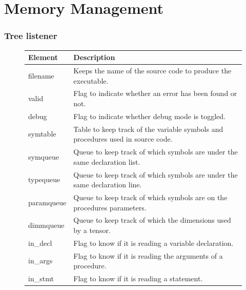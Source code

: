 \section{Memory Management}
\subsubsection{Tree listener}
\begin{figure}[h]
    \centering
    \begin{tabular}{p{1in}p{3in}}
        \toprule
        \textbf{Element} & \textbf{Description}\\
        \midrule filename &
        Keeps the name of the source code to produce the executable.\\

        \midrule valid &
        Flag to indicate whether an error has been found or not.\\

        \midrule debug &
        Flag to indicate whether debug mode is toggled.\\

        \midrule symtable &
        Table to keep track of the variable symbols and procedures used in
        source code.\\

        \midrule symqueue &
        Queue to keep track of which symbols are under the same declaration list.\\

        \midrule typequeue &
        Queue to keep track of which symbols are under the same declaration line.\\

        \midrule paramqueue &
        Queue to keep track of which symbols are on the procedures parameters.\\

        \midrule dimmqueue &
        Queue to keep track of which the dimensions used by a tensor.\\

        \midrule in\_decl &
        Flag to know if it is reading a variable declaration.\\

        \midrule in\_args &
        Flag to know if it is reading the arguments of a procedure.\\

        \midrule in\_stmt &
        Flag to know if it is reading a statement.\\


\end{tabular}
\end{figure}
